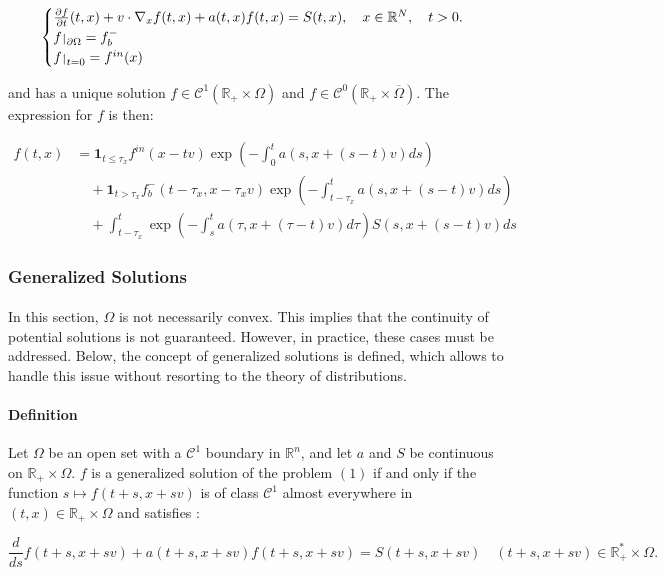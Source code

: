 \documentclass[a4paper, 11pt]{article}
\def\restriction#1#2{\mathchoice
	{\setbox1\hbox{${\displaystyle #1}_{\scriptstyle #2}$}
		\restrictionaux{#1}{#2}}
	{\setbox1\hbox{${\textstyle #1}_{\scriptstyle #2}$}
		\restrictionaux{#1}{#2}}
	{\setbox1\hbox{${\scriptstyle #1}_{\scriptscriptstyle #2}$}
		\restrictionaux{#1}{#2}}
	{\setbox1\hbox{${\scriptscriptstyle #1}_{\scriptscriptstyle #2}$}
		\restrictionaux{#1}{#2}}}
\def\restrictionaux#1#2{{#1\,\smash{\vrule height .8\ht1 depth .85\dp1}}_{\,#2}}
\begin{document}
\[
\begin{cases}
\frac{\partial f}{\partial t}(t,x)+v \cdot \nabla_x f(t,x)+ a(t,x)f(t,x)=S(t,x), \quad x \in \mathbb{R}^N, \quad t>0.\\
\restriction{f}{\partial \Omega}= f_b^-\\
\restriction{f}{t=0}= f^{in}(x)
\end{cases}
\]

and has a unique solution $f \in \mathcal{C}^1(\mathbb{R}_+ \times \Omega)$ and $f \in \mathcal{C}^0(\mathbb{R}_+ \times \overline{\Omega})$. The expression for $f$ is then:


\[
\boxed{
	\begin{aligned}
	f(t,x) &= \mathbf{1}_{t \leq \tau_x} f^{in} (x-tv) \exp\left(-\int_0^t a(s,x+(s-t)v)ds\right) \\
	&\quad + \mathbf{1}_{t > \tau_x} f_b^- (t-\tau_x,x-\tau_x v) \exp\left(-\int_{t-\tau_x}^t a(s,x+(s-t)v)ds\right) \\
	&\quad + \int_{t-\tau_x}^t \exp\left(-\int_{s}^{t}a(\tau,x+(\tau-t)v)d\tau\right) S(s,x+(s-t)v)ds
	\end{aligned}}
\]


\subsubsection{Generalized Solutions}

\paragraph{}
In this section, $\Omega$ is not necessarily convex. This implies that the continuity of potential solutions is not guaranteed. However, in practice, these cases must be addressed. Below, the concept of generalized solutions is defined, which allows to handle this issue without resorting to the theory of distributions.


\paragraph{Definition}

Let $\Omega$ be an open set with a $\mathcal{C}^1$ boundary in $\mathbb{R}^n$, and let $a$ and $S$ be continuous on $\mathbb{R}_+ \times \Omega$. $f$ is a generalized solution of the problem $(1)$ if and only if the function $s \mapsto f(t+s,x+sv)$ is of class $\mathcal{C}^1$ almost everywhere in $(t,x) \in \mathbb{R}_+ \times \Omega$ and satisfies :

\begin{equation}
\frac{d}{ds}f(t+s,x+sv) +a(t+s,x+sv)f(t+s,x+sv) = S(t+s,x+sv) \quad (t+s,x+sv) \in \mathbb{R}_+^* \times \Omega.
\end{equation}
\end{document}
